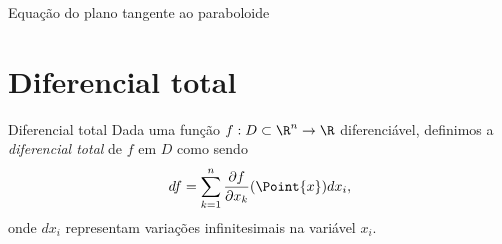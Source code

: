 \begin{example}{Equação do plano tangente ao paraboloide}{}
\begin{center}
\begin{comment}
		\foreach \altura in {0.0125,0.025,...,1.0}{
			\pgfmathparse{sqrt(\altura)}
			\pgfmathsetmacro{\radio}{\pgfmathresult}
			\draw[blue!50,opacity=0.5] plot[domain=\tini:\tfin,smooth,variable=\t] ({\radio*cos(\t r)},{\radio*sin(\t r)},{\altura}); 
		}
		\draw[-latex] (0,0,0) -- (0,0,1.75) node [above] {$z$};	
		\foreach \altura in {0.0125,0.025,...,1.0}{
			\pgfmathparse{sqrt(\altura)}
			\pgfmathsetmacro{\radio}{\pgfmathresult}
			\draw[blue!50,opacity=0.5] plot[domain=\tfin:\tend,smooth,variable=\t] ({\radio*cos(\t r)},{\radio*sin(\t r)},{\altura}); 
		}

    
\draw[dashed,gray!50] (0.5,-0.5,0) -- (0.5,-0.5,{2*(0.5)^2});
\draw[dashed,gray!50] (0.5,0,0) -- (0.5,-0.5,0)--(0,-0.5,0);


\draw[red!20,fill=red!20,opacity=0.5] (-1/2,-1,0) -- (1,1/2,0) -- (3,1/2,2) -- (3/2,-1,2) -- cycle;

\filldraw[red!150] (0.5,-0.5,{2*(0.5)^2}) circle (1pt) node[left]{\footnotesize$\left(x_0,y_0,x_0^2+y_0^2\right)$};




  
	\end{tikzpicture}\end{comment}
\end{center}
\end{example}

\section{Diferencial total}

\begin{definition}{Diferencial total}{}
    Dada uma função $f:D\subset \R^n\to\R$ diferenciável, definimos a \textit{diferencial total} de $f$ em $D$ como sendo
    \begin{equation}\label{diferencial_total}
df=\sum_{k=1}^n \dfrac{\partial f}{\partial x_k}(\Point{x}) d x_i, 
 \end{equation}
    onde $dx_i$ representam variações infinitesimais na variável $x_i$.
\end{definition}

